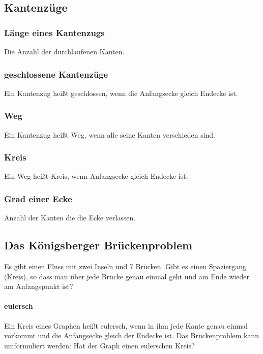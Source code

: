 \subsection{Kantenzüge}
\subsubsection{Länge eines Kantenzugs}Die Anzahl der durchlaufenen Kanten. 
\subsubsection{geschlossene Kantenzüge}Ein Kantenzug heißt geschlossen, wenn die Anfangsecke gleich Endecke ist.
\subsubsection{Weg}Ein Kantenzug heißt Weg, wenn alle seine Kanten verschieden sind. 
\subsubsection{Kreis}Ein Weg heißt Kreis, wenn Anfangsecke gleich Endecke ist. 
\subsubsection{Grad einer Ecke}Anzahl der Kanten die die Ecke verlassen. 

\subsection{Das Königsberger Brückenproblem}
Es gibt einen Fluss mit zwei Inseln und 7 Brücken. Gibt es einen Spaziergang (Kreis), so dass man über jede Brücke genau einmal geht und am Ende wieder am Anfangspunkt ist? 



\paragraph{eulersch}Ein Kreis eines Graphen heißt eulersch, wenn in ihm jede Kante genau einmal vorkommt und die Anfangsecke gleich der Endecke ist. Das Brückenproblem kann umformuliert werden: Hat der Graph einen eulerschen Kreis?
